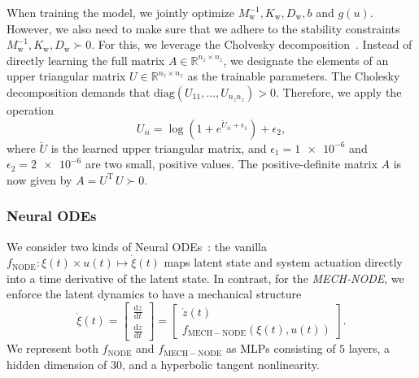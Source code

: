 
When training the model, we jointly optimize $M_\mathrm{w}^{-1}, K_\mathrm{w}, D_\mathrm{w}, b$ and $g(u)$. 
However, we also need to make sure that we adhere to the stability constraints  $M_\mathrm{w}^{-1}, K_\mathrm{w}, D_\mathrm{w} \succ 0$. For this, we leverage the Cholvesky decomposition~\citep{petersen2008matrix}. Instead of directly learning the full matrix $A \in \mathbb{R}^{n_z \times n_z}$, we designate the elements of an upper triangular matrix $U \in \mathbb{R}^{n_z \times n_z}$ as the trainable parameters.
The Cholesky decomposition demands that $\mathrm{diag}(U_{11}, \dots, U_{n_z n_z}) > 0$. Therefore, we apply the operation
\begin{equation}
    U_{ii} = \log \left (1+ e^{\breve{U}_{ii} + \epsilon_1} \right ) + \epsilon_2,
\end{equation}
where $\breve{U}$ is the learned upper triangular matrix, and $\epsilon_1 = \num{1e-6}$ and $\epsilon_2 = \num{2e-6}$ are two small, positive values.
The positive-definite matrix $A$ is now given by $A = U^\mathrm{T} \, U \succ 0$.

\subsubsection{Neural ODEs}
We consider two kinds of Neural ODEs~\citep{chen2018neural}: the vanilla $f_\mathrm{NODE}: \xi(t) \times u(t) \mapsto \dot{\xi}(t)$ maps latent state and system actuation directly into a time derivative of the latent state. In contrast, for the \emph{MECH-NODE}, we enforce the latent dynamics to have a mechanical structure
\begin{equation}
    \dot{\xi}(t) = \begin{bmatrix}
        \frac{\mathrm{d} z}{\mathrm{d}t}\\
        \frac{\mathrm{d} \dot{z}}{\mathrm{d}t}
    \end{bmatrix} = \begin{bmatrix}
        \dot{z}(t)\\
        f_\mathrm{MECH-NODE}(\xi(t), u(t))
    \end{bmatrix}.
\end{equation}
We represent both $f_\mathrm{NODE}$ and $f_\mathrm{MECH-NODE}$ as \glspl{MLP} consisting of $5$ layers, a hidden dimension of $30$, and a hyperbolic tangent nonlinearity.

